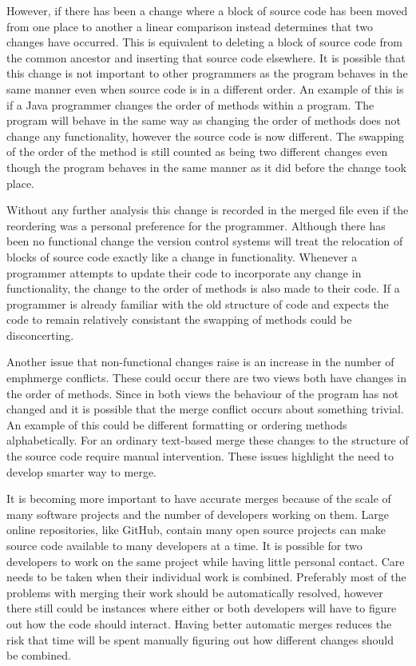 However, if there has been a change where a block of source code has been moved from one place to another a linear comparison instead determines that two changes have occurred.  This is equivalent to deleting a block of source code from the common ancestor and inserting that source code elsewhere. It is possible that this change is not important to other programmers as the program behaves in the same manner even when source code is in a different order.  An example of this is if a Java programmer changes the order of methods within a program.  The program will behave in the same way as changing the order of methods does not change any functionality, however the source code is now different. The swapping of the order of the method is still counted as being two different changes even though the program behaves in the same manner as it did before the change took place.

Without any further analysis this change is recorded in the merged file even if the reordering was a personal preference for the programmer.  Although there has been no functional change the version control systems will treat the relocation of blocks of source code exactly like a change in functionality.  Whenever a programmer attempts to update their code to incorporate any change in functionality, the change to the order of methods is also made to their code.  If a programmer is already familiar with the old structure of code and expects the code to remain relatively consistant the swapping of methods could be disconcerting.

Another issue that non-functional changes raise is an increase in the number of emph{merge conflicts}. These could occur there are two views both have changes in the order of methods. Since in both views the behaviour of the program has not changed and it is possible that the merge conflict occurs about something trivial. An example of this could be different formatting or ordering methods alphabetically. For an ordinary text-based merge these changes to the structure of the source code require manual intervention. These issues highlight the need to develop smarter way to merge.

It is becoming more important to have accurate merges because of the scale of many software projects and the number of developers working on them.  Large online repositories, like GitHub, contain many open source projects can make source code available to many developers at a time.  It is possible for two developers to work on the same project while having little personal contact. Care needs to be taken when their individual work is combined.  Preferably most of the problems with merging their work should be automatically resolved, however there still could be instances where either or both developers will have to figure out how the code should interact. Having better automatic merges reduces the risk that time will be spent manually figuring out how different changes should be combined.

